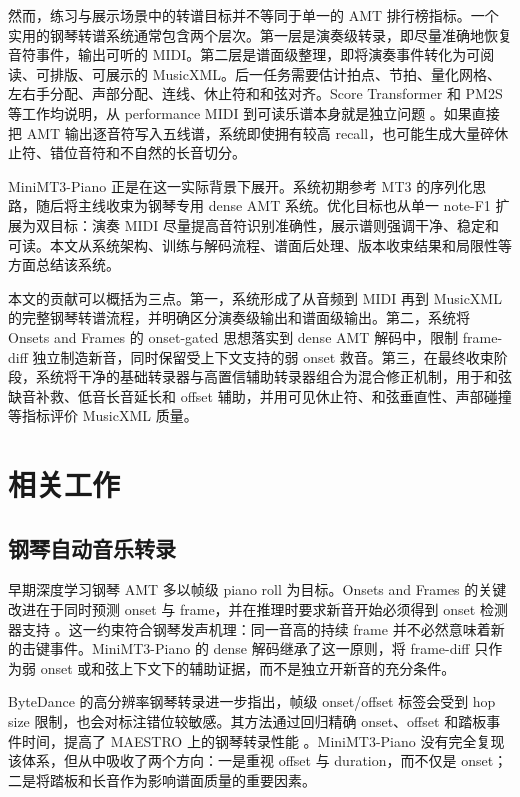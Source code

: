 \documentclass[UTF8,a4paper,zihao=-4]{ctexart}
\begin{document}
然而，练习与展示场景中的转谱目标并不等同于单一的 AMT 排行榜指标。一个实用的钢琴转谱系统通常包含两个层次。第一层是演奏级转录，即尽量准确地恢复音符事件，输出可听的 MIDI。第二层是谱面级整理，即将演奏事件转化为可阅读、可排版、可展示的 MusicXML。后一任务需要估计拍点、节拍、量化网格、左右手分配、声部分配、连线、休止符和和弦对齐。Score Transformer 和 PM2S 等工作均说明，从 performance MIDI 到可读乐谱本身就是独立问题 \cite{suzuki2021scoretransformer,liu2022pm2s,beyer2024midi2score}。如果直接把 AMT 输出逐音符写入五线谱，系统即使拥有较高 recall，也可能生成大量碎休止符、错位音符和不自然的长音切分。

MiniMT3-Piano 正是在这一实际背景下展开。系统初期参考 MT3 的序列化思路，随后将主线收束为钢琴专用 dense AMT 系统。优化目标也从单一 note-F1 扩展为双目标：演奏 MIDI 尽量提高音符识别准确性，展示谱则强调干净、稳定和可读。本文从系统架构、训练与解码流程、谱面后处理、版本收束结果和局限性等方面总结该系统。

本文的贡献可以概括为三点。第一，系统形成了从音频到 MIDI 再到 MusicXML 的完整钢琴转谱流程，并明确区分演奏级输出和谱面级输出。第二，系统将 Onsets and Frames 的 onset-gated 思想落实到 dense AMT 解码中，限制 frame-diff 独立制造新音，同时保留受上下文支持的弱 onset 救音。第三，在最终收束阶段，系统将干净的基础转录器与高置信辅助转录器组合为混合修正机制，用于和弦缺音补救、低音长音延长和 offset 辅助，并用可见休止符、和弦垂直性、声部碰撞等指标评价 MusicXML 质量。

\section{相关工作}

\subsection{钢琴自动音乐转录}

早期深度学习钢琴 AMT 多以帧级 piano roll 为目标。Onsets and Frames 的关键改进在于同时预测 onset 与 frame，并在推理时要求新音开始必须得到 onset 检测器支持 \cite{hawthorne2018onsets}。这一约束符合钢琴发声机理：同一音高的持续 frame 并不必然意味着新的击键事件。MiniMT3-Piano 的 dense 解码继承了这一原则，将 frame-diff 只作为弱 onset 或和弦上下文下的辅助证据，而不是独立开新音的充分条件。

ByteDance 的高分辨率钢琴转录进一步指出，帧级 onset/offset 标签会受到 hop size 限制，也会对标注错位较敏感。其方法通过回归精确 onset、offset 和踏板事件时间，提高了 MAESTRO 上的钢琴转录性能 \cite{kong2021highres}。MiniMT3-Piano 没有完全复现该体系，但从中吸收了两个方向：一是重视 offset 与 duration，而不仅是 onset；二是将踏板和长音作为影响谱面质量的重要因素。
\end{document}
